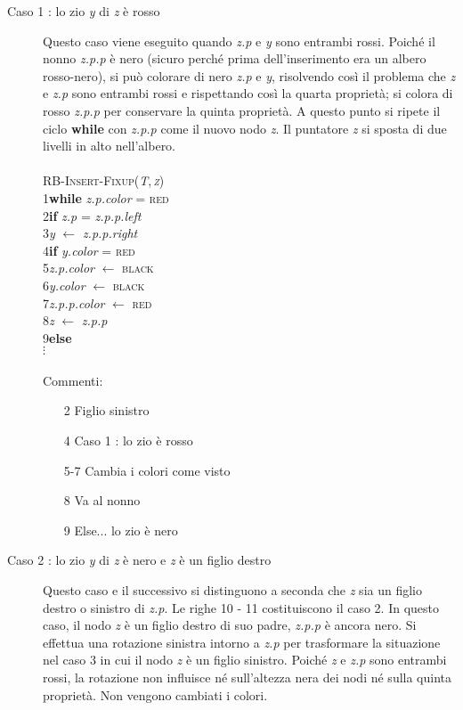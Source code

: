 \documentclass[10pt, a4paper]{report}
\newcommand\firsttab[1][0.5cm]{\hspace*{#1}}
\newcommand\secondtab[1][1cm]{\hspace*{#1}}
\newcommand\thirdtab[1][1.5cm]{\hspace*{#1}}
\newcommand\fourthtab[1][2cm]{\hspace*{#1}}
\begin{document}
\begin{description}
\begin{description}
\item[Caso 1 : lo zio \textit{y} di \textit{z} è rosso]Questo caso viene eseguito quando \textit{z.p} e \textit{y} sono entrambi rossi. Poiché il nonno \textit{z.p.p} è nero (sicuro perché prima dell'inserimento era un albero rosso-nero), si può colorare di nero \textit{z.p} e \textit{y}, risolvendo così il problema che \textit{z} e \textit{z.p} sono entrambi rossi e rispettando così la quarta proprietà; si colora di rosso \textit{z.p.p} per conservare la quinta proprietà. A questo punto si ripete il ciclo \textbf{while} con \textit{z.p.p} come il nuovo nodo \textit{z}. Il puntatore \textit{z} si sposta di due livelli in alto nell'albero.\\\\
\textsc{RB-Insert-Fixup(\textit{T},\,\textit{z})}\\
1\firsttab\textbf{while} \textit{z.p.color} = \textsc{red}\\
2\secondtab\textbf{if} \textit{z.p} = \textit{z.p.p.left}\\
3\thirdtab\textit{y} $\leftarrow$ \textit{z.p.p.right}\\
4\thirdtab\textbf{if} \textit{y.color} = \textsc{red}\\
5\fourthtab\textit{z.p.color} $\leftarrow$ \textsc{black}\\
6\fourthtab\textit{y.color} $\leftarrow$ \textsc{black}\\
7\fourthtab\textit{z.p.p.color} $\leftarrow$ \textsc{red}\\
8\fourthtab\textit{z} $\leftarrow$ \textit{z.p.p}\\
9\thirdtab\textbf{else}\\
$\vdots$\\\\
Commenti:
\begin{enumerate}
\item[2]Figlio sinistro
\item[4]Caso 1 : lo zio è rosso
\item[5-7]Cambia i colori come visto
\item[8]Va al nonno
\item[9]Else... lo zio è nero
\end{enumerate}
\item[Caso 2 : lo zio \textit{y} di \textit{z} è nero e \textit{z} è un figlio destro]Questo caso e il successivo si distinguono a seconda che \textit{z} sia un figlio destro o sinistro di \textit{z.p}. Le righe 10 - 11 costituiscono il caso 2. In questo caso, il nodo \textit{z} è un figlio destro di suo padre, \textit{z.p.p} è ancora nero. Si effettua una rotazione sinistra intorno a \textit{z.p} per trasformare la situazione nel caso 3 in cui il nodo \textit{z} è un figlio sinistro. Poiché \textit{z} e \textit{z.p} sono entrambi rossi, la rotazione non influisce né sull'altezza nera dei nodi né sulla quinta proprietà. Non vengono cambiati i colori.\\\\

\end{description}
\end{description}
\end{document}
